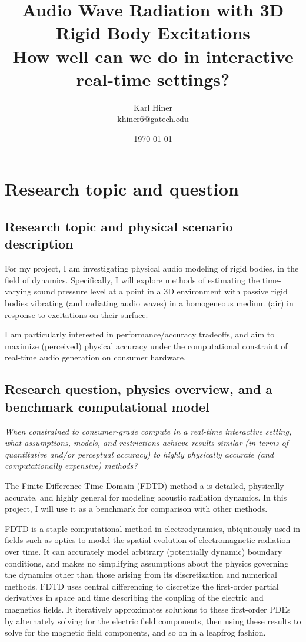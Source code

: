 \documentclass[12pt]{article}
\title{
    Audio Wave Radiation with 3D Rigid Body Excitations\\
    \large How well can we do in interactive real-time settings?
}
\author{Karl Hiner\\khiner6@gatech.edu}
\date{\today}
\begin{document}
\maketitle

\section{Research topic and question}

\subsection{Research topic and physical scenario description}

For my project, I am investigating physical audio modeling of rigid bodies, in the field of dynamics.
Specifically, I will explore methods of estimating the time-varying sound pressure level at a point in a 3D environment with passive rigid bodies vibrating (and radiating audio waves) in a homogeneous medium (air) in response to excitations on their surface.

I am particularly interested in performance/accuracy tradeoffs, and aim to maximize (perceived) physical accuracy under the computational constraint of real-time audio generation on consumer hardware.

\subsection{Research question, physics overview, and a benchmark computational model}

\textit{When constrained to consumer-grade compute in a real-time interactive setting, what assumptions, models, and restrictions achieve results similar (in terms of quantitative and/or perceptual accuracy) to highly physically accurate (and computationally expensive) methods?}

The Finite-Difference Time-Domain (FDTD) method a is detailed, physically accurate, and highly general for modeling acoustic radiation dynamics.
In this project, I will use it as a benchmark for comparison with other methods.

FDTD is a staple computational method in electrodynamics, ubiquitously used in fields such as optics to model the spatial evolution of electromagnetic radiation over time.
It can accurately model arbitrary (potentially dynamic) boundary conditions, and makes no simplifying assumptions about the physics governing the dynamics other than those arising from its discretization and numerical methods.
FDTD uses central differencing to discretize the first-order partial derivatives in space and time describing the coupling of the electric and magnetics fields.
It iteratively approximates solutions to these first-order PDEs by alternately solving for the electric field components, then using these results to solve for the magnetic field components, and so on in a leapfrog fashion.
\end{document}
